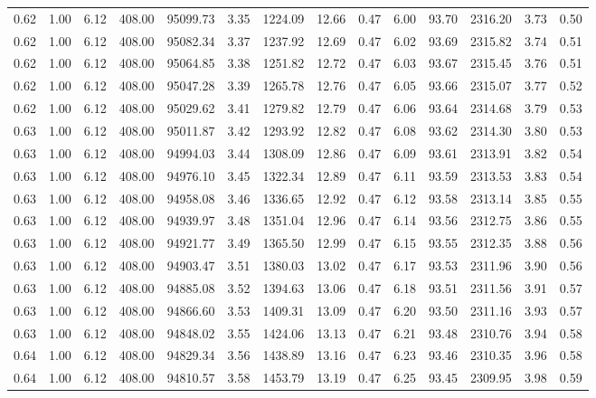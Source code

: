 \begin{table}[!ht]
\begin{tabular}{rrrrrrrrrrrrrr}
0.62 & 1.00 & 6.12 & 408.00 & 95099.73 & 3.35 & 1224.09 & 12.66 & 0.47 & 6.00 & 93.70 & 2316.20 & 3.73 & 0.50 \\
0.62 & 1.00 & 6.12 & 408.00 & 95082.34 & 3.37 & 1237.92 & 12.69 & 0.47 & 6.02 & 93.69 & 2315.82 & 3.74 & 0.51 \\
0.62 & 1.00 & 6.12 & 408.00 & 95064.85 & 3.38 & 1251.82 & 12.72 & 0.47 & 6.03 & 93.67 & 2315.45 & 3.76 & 0.51 \\
0.62 & 1.00 & 6.12 & 408.00 & 95047.28 & 3.39 & 1265.78 & 12.76 & 0.47 & 6.05 & 93.66 & 2315.07 & 3.77 & 0.52 \\
0.62 & 1.00 & 6.12 & 408.00 & 95029.62 & 3.41 & 1279.82 & 12.79 & 0.47 & 6.06 & 93.64 & 2314.68 & 3.79 & 0.53 \\
0.63 & 1.00 & 6.12 & 408.00 & 95011.87 & 3.42 & 1293.92 & 12.82 & 0.47 & 6.08 & 93.62 & 2314.30 & 3.80 & 0.53 \\
0.63 & 1.00 & 6.12 & 408.00 & 94994.03 & 3.44 & 1308.09 & 12.86 & 0.47 & 6.09 & 93.61 & 2313.91 & 3.82 & 0.54 \\
0.63 & 1.00 & 6.12 & 408.00 & 94976.10 & 3.45 & 1322.34 & 12.89 & 0.47 & 6.11 & 93.59 & 2313.53 & 3.83 & 0.54 \\
0.63 & 1.00 & 6.12 & 408.00 & 94958.08 & 3.46 & 1336.65 & 12.92 & 0.47 & 6.12 & 93.58 & 2313.14 & 3.85 & 0.55 \\
0.63 & 1.00 & 6.12 & 408.00 & 94939.97 & 3.48 & 1351.04 & 12.96 & 0.47 & 6.14 & 93.56 & 2312.75 & 3.86 & 0.55 \\
0.63 & 1.00 & 6.12 & 408.00 & 94921.77 & 3.49 & 1365.50 & 12.99 & 0.47 & 6.15 & 93.55 & 2312.35 & 3.88 & 0.56 \\
0.63 & 1.00 & 6.12 & 408.00 & 94903.47 & 3.51 & 1380.03 & 13.02 & 0.47 & 6.17 & 93.53 & 2311.96 & 3.90 & 0.56 \\
0.63 & 1.00 & 6.12 & 408.00 & 94885.08 & 3.52 & 1394.63 & 13.06 & 0.47 & 6.18 & 93.51 & 2311.56 & 3.91 & 0.57 \\
0.63 & 1.00 & 6.12 & 408.00 & 94866.60 & 3.53 & 1409.31 & 13.09 & 0.47 & 6.20 & 93.50 & 2311.16 & 3.93 & 0.57 \\
0.63 & 1.00 & 6.12 & 408.00 & 94848.02 & 3.55 & 1424.06 & 13.13 & 0.47 & 6.21 & 93.48 & 2310.76 & 3.94 & 0.58 \\
0.64 & 1.00 & 6.12 & 408.00 & 94829.34 & 3.56 & 1438.89 & 13.16 & 0.47 & 6.23 & 93.46 & 2310.35 & 3.96 & 0.58 \\
0.64 & 1.00 & 6.12 & 408.00 & 94810.57 & 3.58 & 1453.79 & 13.19 & 0.47 & 6.25 & 93.45 & 2309.95 & 3.98 & 0.59 \\

\end{tabular}
\end{table}
